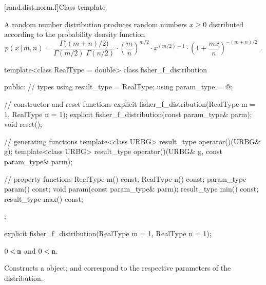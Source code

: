 
[rand.dist.norm.f]{Class template }%
%
%

\pnum
A  random number distribution
produces random numbers $x \ge 0$
distributed according to
the probability density function%
%
%
\[ p(x\,|\,m,n) = \frac{\Gamma\big((m+n)/2\big)}{\Gamma(m/2) \; \Gamma(n/2)}
     \cdot \left(\frac{m}{n}\right)^{m/2}
     \cdot x^{(m/2)-1}
     \cdot \left(1 + \frac{m x}{n}\right)^{-(m + n)/2}
     \text{ .} \]

%
\begin{codeblock}
template<class RealType = double>
  class fisher_f_distribution {
  public:
    // types
    using result_type = RealType;
    using param_type  = @\unspec@;

    // constructor and reset functions
    explicit fisher_f_distribution(RealType m = 1, RealType n = 1);
    explicit fisher_f_distribution(const param_type& parm);
    void reset();

    // generating functions
    template<class URBG>
      result_type operator()(URBG& g);
    template<class URBG>
      result_type operator()(URBG& g, const param_type& parm);

    // property functions
    RealType m() const;
    RealType n() const;
    param_type param() const;
    void param(const param_type& parm);
    result_type min() const;
    result_type max() const;
  };
\end{codeblock}


%
\begin{itemdecl}
explicit fisher_f_distribution(RealType m = 1, RealType n = 1);
\end{itemdecl}

\begin{itemdescr}
\pnum
\requires $0 < \texttt{m}$ and $0 < \texttt{n}$.

\pnum
\effects Constructs a  object;
 and 
correspond to the respective parameters of the distribution.
\end{itemdescr}

